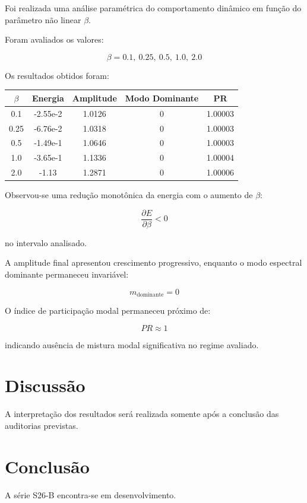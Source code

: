 \documentclass[11pt,a4paper]{article}
\begin{document}
Foi realizada uma análise paramétrica do comportamento
dinâmico em função do parâmetro não linear $\beta$.

Foram avaliados os valores:

\[
\beta =
0.1,\ 0.25,\ 0.5,\ 1.0,\ 2.0
\]

Os resultados obtidos foram:

\begin{table}[h]
\centering
\begin{tabular}{ccccc}
\toprule
$\beta$ & Energia & Amplitude & Modo Dominante & PR\\
\midrule
0.1 & -2.55e-2 & 1.0126 & 0 & 1.00003\\
0.25 & -6.76e-2 & 1.0318 & 0 & 1.00003\\
0.5 & -1.49e-1 & 1.0646 & 0 & 1.00003\\
1.0 & -3.65e-1 & 1.1336 & 0 & 1.00004\\
2.0 & -1.13 & 1.2871 & 0 & 1.00006\\
\bottomrule
\end{tabular}
\end{table}


Observou-se uma redução monotônica da energia com o
aumento de $\beta$:

\[
\frac{\partial E}{\partial \beta}<0
\]

no intervalo analisado.

A amplitude final apresentou crescimento progressivo,
enquanto o modo espectral dominante permaneceu invariável:

\[
m_{\mathrm{dominante}}=0
\]

O índice de participação modal permaneceu próximo de:

\[
PR \approx 1
\]

indicando ausência de mistura modal significativa no regime
avaliado.

\section{Discussão}

A interpretação dos resultados será realizada somente
após a conclusão das auditorias previstas.


\section{Conclusão}

A série S26-B encontra-se em desenvolvimento.

\end{document}
